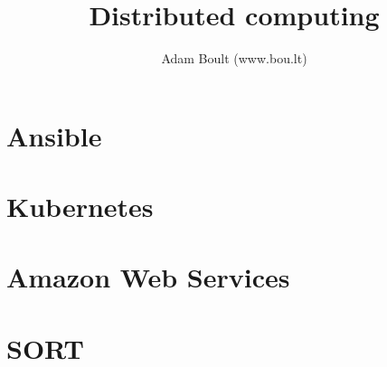 \documentclass[oneside]{book}
\begin{document}
\author{Adam Boult (www.bou.lt)}
\title{Distributed computing}
\maketitle

\setcounter{tocdepth}{0}
\tableofcontents



\part{Ansible}


\part{Kubernetes}


\part{Amazon Web Services}


\part{SORT}

\end{document}
